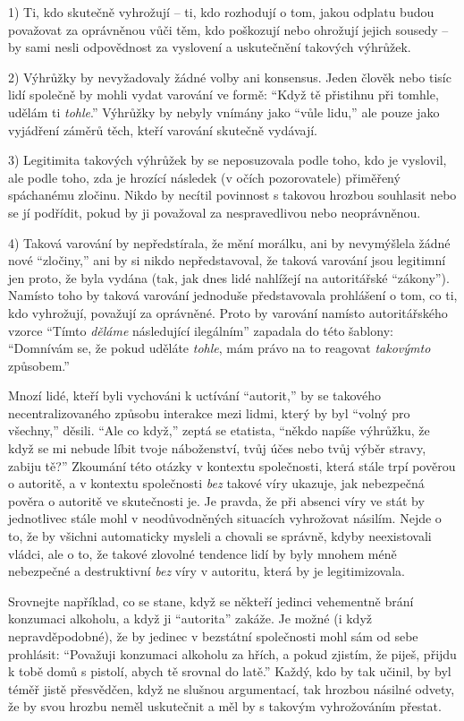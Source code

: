 \documentclass{book}
\begin{document}
1) Ti, kdo skutečně vyhrožují -- ti, kdo rozhodují o tom, jakou odplatu budou považovat za oprávněnou vůči těm, kdo poškozují nebo ohrožují jejich sousedy -- by sami nesli odpovědnost za vyslovení a uskutečnění takových výhrůžek.

2) Výhrůžky by nevyžadovaly žádné volby ani konsensus. Jeden člověk nebo tisíc lidí společně by mohli vydat varování ve formě: \enquote{Když tě přistihnu při tomhle, udělám ti \emph{tohle}.} Výhrůžky by nebyly vnímány jako \enquote{vůle lidu,} ale pouze jako vyjádření záměrů těch, kteří varování skutečně vydávají.

3) Legitimita takových výhrůžek by se neposuzovala podle toho, kdo je vyslovil, ale podle toho, zda je hrozící následek (v očích pozorovatele) přiměřený spáchanému zločinu. Nikdo by necítil povinnost s takovou hrozbou souhlasit nebo se jí podřídit, pokud by ji považoval za nespravedlivou nebo neoprávněnou.

4) Taková varování by nepředstírala, že mění morálku, ani by nevymýšlela žádné nové \enquote{zločiny,} ani by si nikdo nepředstavoval, že taková varování jsou legitimní jen proto, že byla vydána (tak, jak dnes lidé nahlížejí na autoritářské \enquote{zákony}). Namísto toho by taková varování jednoduše představovala prohlášení o tom, co ti, kdo vyhrožují, považují za oprávněné. Proto by varování namísto autoritářského vzorce \enquote{Tímto \emph{děláme} následující ilegálním} zapadala do této šablony: \enquote{Domnívám se, že pokud uděláte \emph{tohle}, mám právo na to reagovat \emph{takovýmto} způsobem.}

Mnozí lidé, kteří byli vychováni k uctívání \enquote{autorit,} by se takového necentralizovaného způsobu interakce mezi lidmi, který by byl \enquote{volný pro všechny,} děsili. \enquote{Ale co když,} zeptá se etatista, \enquote{někdo napíše výhrůžku, že když se mi nebude líbit tvoje náboženství, tvůj účes nebo tvůj výběr stravy, zabiju tě?} Zkoumání této otázky v kontextu společnosti, která stále trpí pověrou o autoritě, a v kontextu společnosti \emph{bez} takové víry ukazuje, jak nebezpečná pověra o autoritě ve skutečnosti je. Je pravda, že při absenci víry ve stát by jednotlivec stále mohl v neodůvodněných situacích vyhrožovat násilím. Nejde o to, že by všichni automaticky mysleli a chovali se správně, kdyby neexistovali vládci, ale o to, že takové zlovolné tendence lidí by byly mnohem méně nebezpečné a destruktivní \emph{bez} víry v autoritu, která by je legitimizovala.

Srovnejte například, co se stane, když se někteří jedinci vehementně brání konzumaci alkoholu, a když ji \enquote{autorita} zakáže. Je možné (i když nepravděpodobné), že by jedinec v bezstátní společnosti mohl sám od sebe prohlásit: \enquote{Považuji konzumaci alkoholu za hřích, a pokud zjistím, že piješ, přijdu k tobě domů s pistolí, abych tě srovnal do latě.} Každý, kdo by tak učinil, by byl téměř jistě přesvědčen, když ne slušnou argumentací, tak hrozbou násilné odvety, že by svou hrozbu neměl uskutečnit a měl by s takovým vyhrožováním přestat.
\end{document}
